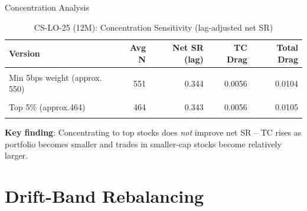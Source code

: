 \documentclass[
  ignorenonframetext,
  aspectratio=169]{beamer}
\begin{document}
\begin{frame}{Concentration Analysis}
\label{concentration-analysis}
\begin{table}[!h]
\centering
\caption{\label{tab:concentration}CS-LO-25 (12M): Concentration Sensitivity (lag-adjusted net SR)}
\centering
\fontsize{8}{10}\selectfont
\begin{tabular}[t]{lrrrr}
\toprule
Version & Avg N & Net SR (lag) & TC Drag & Total Drag\\
\midrule
\textbf{\cellcolor{gray!10}{Full (approx. 4,600 stocks)}} & \textbf{\cellcolor{gray!10}{4629}} & \textbf{\cellcolor{gray!10}{0.341}} & \textbf{\cellcolor{gray!10}{0.0055}} & \textbf{\cellcolor{gray!10}{0.0106}}\\
Min 5bps weight (approx. 550) & 551 & 0.344 & 0.0056 & 0.0104\\
\cellcolor{gray!10}{Top 10\% (approx.927)} & \cellcolor{gray!10}{927} & \cellcolor{gray!10}{0.344} & \cellcolor{gray!10}{0.0055} & \cellcolor{gray!10}{0.0104}\\
Top 5\% (approx.464) & 464 & 0.343 & 0.0056 & 0.0105\\
\cellcolor{gray!10}{Top 2.5\% (approx.233)} & \cellcolor{gray!10}{233} & \cellcolor{gray!10}{0.339} & \cellcolor{gray!10}{0.0059} & \cellcolor{gray!10}{0.0108}\\
\bottomrule
\end{tabular}
\end{table}

\small \textbf{Key finding}: Concentrating to top stocks does \emph{not}
improve net SR -- TC rises as portfolio becomes smaller and trades in
smaller-cap stocks become relatively larger.
\end{frame}

\section{Drift-Band Rebalancing}\label{drift-band-rebalancing}
\end{document}
